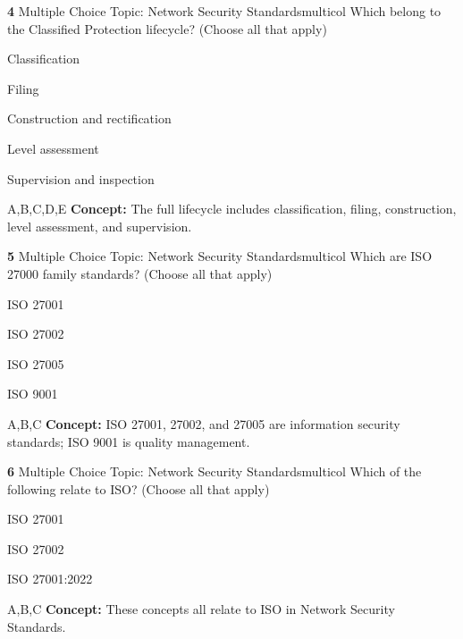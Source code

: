 \documentclass[10pt,a4paper]{article}
\begin{document}
\begin{qcard}{\color{white}\textbf{4} \hfill \small Multiple Choice \textbar{} Topic: Network Security Standards}{multicol}
Which belong to the Classified Protection lifecycle? (Choose all that apply)

\begin{qoptions}
\item Classification
\item Filing
\item Construction and rectification
\item Level assessment
\item Supervision and inspection
\end{qoptions}
\begin{explainbox}{A,B,C,D,E}
\textbf{Concept:} The full lifecycle includes classification, filing, construction, level assessment, and supervision.
\end{explainbox}
\end{qcard}

\begin{qcard}{\color{white}\textbf{5} \hfill \small Multiple Choice \textbar{} Topic: Network Security Standards}{multicol}
Which are ISO 27000 family standards? (Choose all that apply)

\begin{qoptions}
\item ISO 27001
\item ISO 27002
\item ISO 27005
\item ISO 9001
\end{qoptions}
\begin{explainbox}{A,B,C}
\textbf{Concept:} ISO 27001, 27002, and 27005 are information security standards; ISO 9001 is quality management.
\end{explainbox}
\end{qcard}

\begin{qcard}{\color{white}\textbf{6} \hfill \small Multiple Choice \textbar{} Topic: Network Security Standards}{multicol}
Which of the following relate to ISO? (Choose all that apply)

\begin{qoptions}
\item ISO 27001
\item ISO 27002
\item ISO 27001:2022
\end{qoptions}
\begin{explainbox}{A,B,C}
\textbf{Concept:} These concepts all relate to ISO in Network Security Standards.
\end{explainbox}
\end{qcard}
\end{document}

